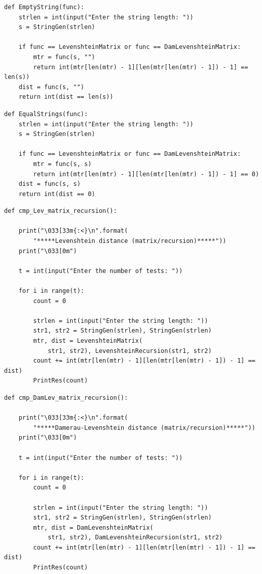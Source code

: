 \documentclass[12pt]{report}
\begin{document}
\begin{lstlisting}[label=randStr,caption=Функция проверки работы алгоритмов при пустой строке]
def EmptyString(func):
    strlen = int(input("Enter the string length: "))
    s = StringGen(strlen)

    if func == LevenshteinMatrix or func == DamLevenshteinMatrix:
        mtr = func(s, "")
        return int(mtr[len(mtr) - 1][len(mtr[len(mtr) - 1]) - 1] == len(s))
    dist = func(s, "")
    return int(dist == len(s))
\end{lstlisting}

\begin{lstlisting}[label=randStr,caption=Функция проверки работы алгоритмов при одинаковых строках]
def EqualStrings(func):
    strlen = int(input("Enter the string length: "))
    s = StringGen(strlen)

    if func == LevenshteinMatrix or func == DamLevenshteinMatrix:
        mtr = func(s, s)
        return int(mtr[len(mtr) - 1][len(mtr[len(mtr) - 1]) - 1] == 0)
    dist = func(s, s)
    return int(dist == 0)
\end{lstlisting}

\begin{lstlisting}[label=randStr,caption=Функция проверки работы матричного и рекурсивного алгоритма поиска расстояния Левенштейна]
def cmp_Lev_matrix_recursion():

    print("\033[33m{:<}\n".format(
        "*****Levenshtein distance (matrix/recursion)*****"))
    print("\033[0m")

    t = int(input("Enter the number of tests: "))

    for i in range(t):
        count = 0

        strlen = int(input("Enter the string length: "))
        str1, str2 = StringGen(strlen), StringGen(strlen)
        mtr, dist = LevenshteinMatrix(
            str1, str2), LevenshteinRecursion(str1, str2)
        count += int(mtr[len(mtr) - 1][len(mtr[len(mtr) - 1]) - 1] == dist)
        PrintRes(count)
\end{lstlisting}

\begin{lstlisting}[label=randStr,caption=Функция проверки работы матричного и рекурсивного алгоритма поиска расстояния Дамерау-Левенштейна]
def cmp_DamLev_matrix_recursion():

    print("\033[33m{:<}\n".format(
        "*****Damerau-Levenshtein distance (matrix/recursion)*****"))
    print("\033[0m")

    t = int(input("Enter the number of tests: "))

    for i in range(t):
        count = 0

        strlen = int(input("Enter the string length: "))
        str1, str2 = StringGen(strlen), StringGen(strlen)
        mtr, dist = DamLevenshteinMatrix(
            str1, str2), DamLevenshteinRecursion(str1, str2)
        count += int(mtr[len(mtr) - 1][len(mtr[len(mtr) - 1]) - 1] == dist)
        PrintRes(count)
\end{lstlisting}
\end{document}
